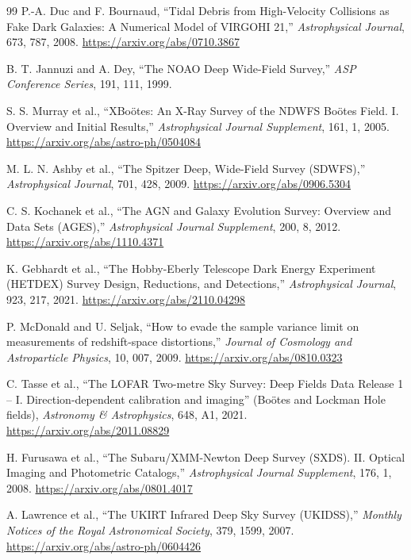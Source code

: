 \begin{thebibliography}{99}
P.-A. Duc and F. Bournaud,
``Tidal Debris from High-Velocity Collisions as Fake Dark Galaxies: A Numerical Model of VIRGOHI 21,''
\emph{Astrophysical Journal}, 673, 787, 2008.
\url{https://arxiv.org/abs/0710.3867}

B. T. Jannuzi and A. Dey,
``The NOAO Deep Wide-Field Survey,''
\emph{ASP Conference Series}, 191, 111, 1999.

S. S. Murray et al.,
``XBo\"otes: An X-Ray Survey of the NDWFS Bo\"otes Field. I. Overview and Initial Results,''
\emph{Astrophysical Journal Supplement}, 161, 1, 2005.
\url{https://arxiv.org/abs/astro-ph/0504084}

M. L. N. Ashby et al.,
``The Spitzer Deep, Wide-Field Survey (SDWFS),''
\emph{Astrophysical Journal}, 701, 428, 2009.
\url{https://arxiv.org/abs/0906.5304}

C. S. Kochanek et al.,
``The AGN and Galaxy Evolution Survey: Overview and Data Sets (AGES),''
\emph{Astrophysical Journal Supplement}, 200, 8, 2012.
\url{https://arxiv.org/abs/1110.4371}

K. Gebhardt et al.,
``The Hobby-Eberly Telescope Dark Energy Experiment (HETDEX) Survey Design, Reductions, and Detections,''
\emph{Astrophysical Journal}, 923, 217, 2021.
\url{https://arxiv.org/abs/2110.04298}

P. McDonald and U. Seljak,
``How to evade the sample variance limit on measurements of redshift-space distortions,''
\emph{Journal of Cosmology and Astroparticle Physics}, 10, 007, 2009.
\url{https://arxiv.org/abs/0810.0323}

C. Tasse et al.,
``The LOFAR Two-metre Sky Survey: Deep Fields Data Release 1 -- I. Direction-dependent calibration and imaging'' (Bo\"otes and Lockman Hole fields),
\emph{Astronomy \& Astrophysics}, 648, A1, 2021.
\url{https://arxiv.org/abs/2011.08829}

H. Furusawa et al.,
``The Subaru/XMM-Newton Deep Survey (SXDS). II. Optical Imaging and Photometric Catalogs,''
\emph{Astrophysical Journal Supplement}, 176, 1, 2008.
\url{https://arxiv.org/abs/0801.4017}

A. Lawrence et al.,
``The UKIRT Infrared Deep Sky Survey (UKIDSS),''
\emph{Monthly Notices of the Royal Astronomical Society}, 379, 1599, 2007.
\url{https://arxiv.org/abs/astro-ph/0604426}


\end{thebibliography}
